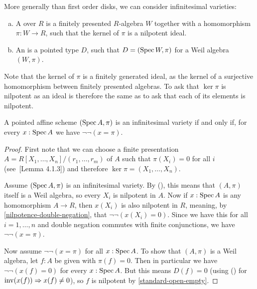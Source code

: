 More generally than first order disks, we can consider infinitesimal varieties:

\begin{definition}
  \begin{enumerate}[(a)]
  \item A  over $R$ is a finitely presented $R$-algebra
    $W$ together with a homomorphism $\pi : W \to R$, such that the kernel of $\pi$ is a nilpotent ideal.
  \item An  is a pointed type $D$,
    such that $D = (\operatorname{Spec} W, \pi)$ for a Weil algebra $(W, \pi)$.
  \end{enumerate}
\end{definition}

Note that the kernel of $\pi$ is a finitely generated ideal,
as the kernel of a surjective homomorphism between finitely presented algebras.
To ask that $\ker \pi$ is nilpotent as an ideal
is therefore the same as to ask that each of its elements is nilpotent.

\begin{lemma}%
  \label{characterization-infinitesimal-variety}
  A pointed affine scheme $(\operatorname{Spec} A, \pi)$
  is an infinitesimal variety
  if and only if,
  for every $x : \operatorname{Spec} A$ we have $\lnot \lnot (x = \pi)$.
\end{lemma}

\begin{proof}
  First note that we can choose a finite presentation
  $A = R[X_1, \dots, X_n]/(r_1, \dots, r_m)$
  of $A$
  such that $\pi(X_i) = 0$ for all $i$
  (see~\cite{david-orbifolds}[Lemma 4.1.3])
  and therefore $\ker \pi = (X_1, \dots, X_n)$.

  Assume $(\operatorname{Spec} A, \pi)$ is an infinitesimal variety.
  By (), this means that $(A, \pi)$ itself is a Weil algebra,
  so every $X_i$ is nilpotent in $A$.
  Now if $x : \operatorname{Spec} A$ is any homomorphism $A \to R$,
  then $x(X_i)$ is also nilpotent in $R$,
  meaning, by \cref{nilpotence-double-negation}, that $\lnot \lnot (x(X_i) = 0)$.
  Since we have this for all $i = 1, \dots, n$
  and double negation commutes with finite conjunctions,
  we have $\lnot \lnot (x = \pi)$.

  Now assume $\lnot \lnot (x = \pi)$ for all $x : \operatorname{Spec} A$.
  To show that $(A, \pi)$ is a Weil algebra,
  let $f : A$ be given with $\pi(f) = 0$.
  Then in particular we have $\lnot \lnot (x(f) = 0)$
  for every $x : \operatorname{Spec} A$.
  But this means $D(f) = 0$
  (using () for $\mathrm{inv}(x(f)) \Rightarrow x(f) \neq 0$),
  so $f$ is nilpotent by \cref{standard-open-empty}.
\end{proof}

